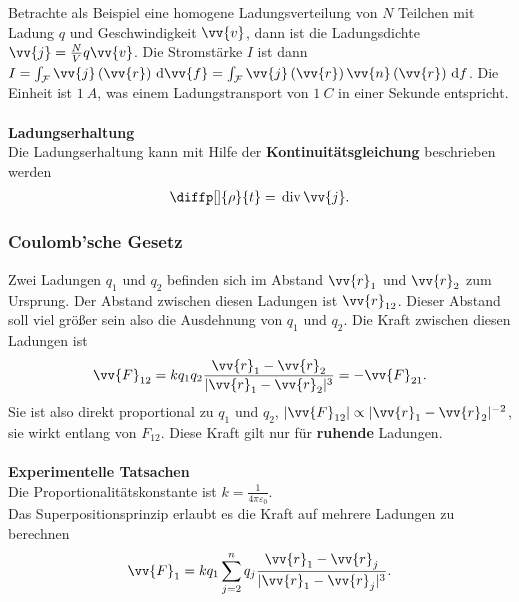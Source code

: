 \documentclass[a4paper,12pt]{article}
\newcommand{\td}{\,\text{d}}
\numberwithin{equation}{section}
\begin{document}
Betrachte als Beispiel eine homogene Ladungsverteilung von $N$ Teilchen mit Ladung $q$ und Geschwindigkeit $\vv{v}$, dann ist die Ladungsdichte $\vv{j}=\tfrac{N}{V}q\vv{v}$. 
Die Stromstärke $I$ ist dann $I=\int_{\mathcal{F}}^{}\vv{j}\left(\vv{r}\right)\td \vv{f}=\int_{\mathcal{F}}^{}\vv{j}\left(\vv{r}\right)\vv{n}\left(\vv{r}\right)\td f$.
Die Einheit ist $\SI{1}{A}$, was einem Ladungstransport von $\SI{1}{C}$ in einer Sekunde entspricht.
\\\hfill\\\textbf{Ladungserhaltung}\\ 
Die Ladungserhaltung kann mit Hilfe der \textbf{Kontinuitätsgleichung} beschrieben werden
\begin{align} 
        \diffp[]{\rho }{t}=\,\text{div}\,\vv{j}
.\end{align} 

\subsubsection{Coulomb'sche Gesetz}
Zwei Ladungen $q_1$ und $q_2$ befinden sich im Abstand $\vv{r}_1$ und $\vv{r}_2$ zum Ursprung.
Der Abstand zwischen diesen Ladungen ist $\vv{r}_{12}$.
Dieser Abstand soll viel größer sein also die Ausdehnung von $q_1$ und $q_2$.
Die Kraft zwischen diesen Ladungen ist
\begin{align} 
        \vv{F}_{12}=kq_1q_2\dfrac{\vv{r}_1-\vv{r}_2}{|\vv{r}_1-\vv{r}_2|^3}=-\vv{F}_{21}
.\end{align} 
Sie ist also direkt proportional zu $q_1$ und $q_2$, $|\vv{F}_{12}|\propto |\vv{r}_1-\vv{r}_2|^{-2}$, sie wirkt entlang von $F_{12}$.
Diese Kraft gilt nur für \textbf{ruhende} Ladungen.
\\\hfill\\\textbf{Experimentelle Tatsachen}\\ 
Die Proportionalitätskonstante ist $k=\tfrac{1}{4\pi \varepsilon _0}$.\\\indent
Das Superpositionsprinzip erlaubt es die Kraft auf mehrere Ladungen zu berechnen
\begin{align} 
        \vv{F}_1=kq_1\sum_{j=2}^{n}q_j\dfrac{\vv{r}_1-\vv{r}_j}{|\vv{r}_1-\vv{r}_j|^3}
.\end{align} 
\end{document}
